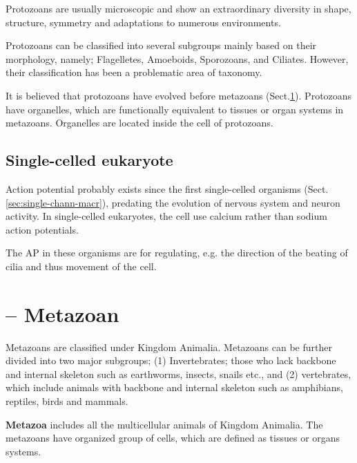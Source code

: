 Protozoans are usually microscopic and show an extraordinary diversity in shape,
structure, symmetry and adaptations to numerous environments.

Protozoans can be classified into several subgroups mainly based on their
morphology, namely; Flagelletes, Amoeboids, Sporozoans, and Ciliates.  However,
their classification has been a problematic area of taxonomy.

It is believed that protozoans have evolved before metazoans
(Sect.\ref{sec:metazoan-brain}).
Protozoans have organelles, which are functionally equivalent to tissues or
organ systems in metazoans. Organelles are located inside the cell of
protozoans.

\subsection{Single-celled eukaryote}
\label{sec:single-celled-eukaryote}

Action potential probably exists since the first single-celled organisms 
(Sect.\ref{sec:single-chann-macr}), predating the evolution of nervous system
and neuron activity. In single-celled eukaryotes, the cell
use calcium rather than sodium action potentials.

The AP in these organisms are for regulating, e.g. the direction of the beating
of cilia and thus movement of the cell. 



\section{-- Metazoan}
\label{sec:metazoan-brain}

Metazoans are classified under Kingdom Animalia.
Metazoans can be further divided into two major subgroups; (1) Invertebrates;
those who lack backbone and internal skeleton such as earthworms, insects,
snails etc., and (2) vertebrates,  which include animals with backbone and
internal skeleton such as amphibians, reptiles, birds and mammals.

{\bf Metazoa} includes all the multicellular animals of Kingdom Animalia. The
metazoans have organized group of cells, which are defined as tissues or organs
systems.


